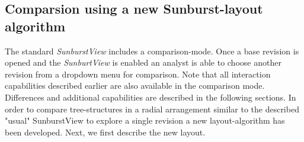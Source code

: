 \subsection{Comparsion using a new Sunburst-layout algorithm}\label{subsec::comparison}
The standard \emph{SunburstView} includes a comparison-mode. Once a base revision is opened and the \emph{SunburtView} is enabled an analyst is able to choose another revision from a dropdown menu for comparison. Note that all interaction capabilities described earlier are also available in the comparison mode. Differences and additional capabilities are described in the following sections. In order to compare tree-structures in a radial arrangement similar to the described "usual" SunburstView to explore a single revision a new layout-algorithm has been developed. Next, we first describe the new layout.

